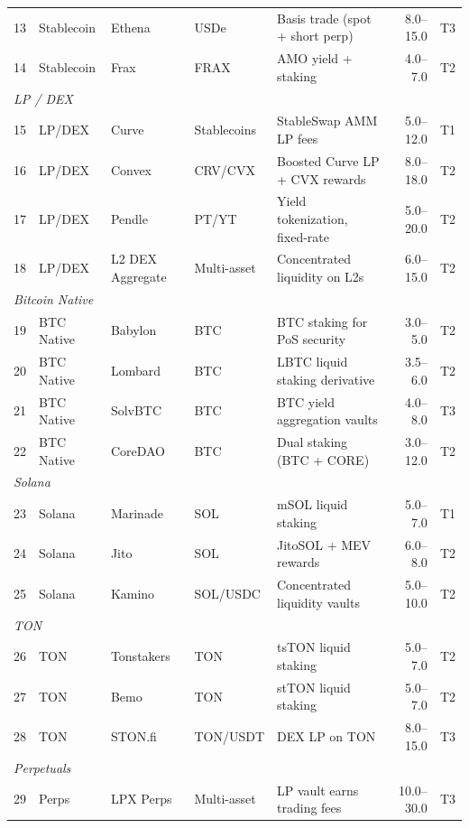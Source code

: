 \begin{table}[t]
\begin{tabular}{@{}rllllrr@{}}
13 & Stablecoin & Ethena & USDe & Basis trade (spot + short perp) & 8.0--15.0 & T3 \\
14 & Stablecoin & Frax & FRAX & AMO yield + staking & 4.0--7.0 & T2 \\
\midrule
\multicolumn{7}{l}{\textit{LP / DEX}} \\
15 & LP/DEX & Curve & Stablecoins & StableSwap AMM LP fees & 5.0--12.0 & T1 \\
16 & LP/DEX & Convex & CRV/CVX & Boosted Curve LP + CVX rewards & 8.0--18.0 & T2 \\
17 & LP/DEX & Pendle & PT/YT & Yield tokenization, fixed-rate & 5.0--20.0 & T2 \\
18 & LP/DEX & L2 DEX Aggregate & Multi-asset & Concentrated liquidity on L2s & 6.0--15.0 & T2 \\
\midrule
\multicolumn{7}{l}{\textit{Bitcoin Native}} \\
19 & BTC Native & Babylon & BTC & BTC staking for PoS security & 3.0--5.0 & T2 \\
20 & BTC Native & Lombard & BTC & LBTC liquid staking derivative & 3.5--6.0 & T2 \\
21 & BTC Native & SolvBTC & BTC & BTC yield aggregation vaults & 4.0--8.0 & T3 \\
22 & BTC Native & CoreDAO & BTC & Dual staking (BTC + CORE) & 3.0--12.0 & T2 \\
\midrule
\multicolumn{7}{l}{\textit{Solana}} \\
23 & Solana & Marinade & SOL & mSOL liquid staking & 5.0--7.0 & T1 \\
24 & Solana & Jito & SOL & JitoSOL + MEV rewards & 6.0--8.0 & T2 \\
25 & Solana & Kamino & SOL/USDC & Concentrated liquidity vaults & 5.0--10.0 & T2 \\
\midrule
\multicolumn{7}{l}{\textit{TON}} \\
26 & TON & Tonstakers & TON & tsTON liquid staking & 5.0--7.0 & T2 \\
27 & TON & Bemo & TON & stTON liquid staking & 5.0--7.0 & T2 \\
28 & TON & STON.fi & TON/USDT & DEX LP on TON & 8.0--15.0 & T3 \\
\midrule
\multicolumn{7}{l}{\textit{Perpetuals}} \\
29 & Perps & LPX Perps & Multi-asset & LP vault earns trading fees & 10.0--30.0 & T3 \\
\bottomrule
\end{tabular}
\end{table}

